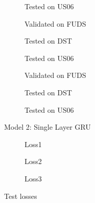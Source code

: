 \begin{figure}[htbp]
\begin{subfigure}[b]{0.33\textwidth}
        \caption{Tested on US06}
    \end{subfigure}
    \begin{subfigure}[b]{0.32\textwidth}
        \centering
        
        \caption{Validated on FUDS}
    \end{subfigure}
    \hfill
    \begin{subfigure}[b]{0.33\textwidth}
        \centering
        
        \caption{Tested on DST}
    \end{subfigure}
    \hfill
    \begin{subfigure}[b]{0.33\textwidth}
        \centering
        
        \caption{Tested on US06}
    \end{subfigure}
        \begin{subfigure}[b]{0.32\textwidth}
        \centering
        
        \caption{Validated on FUDS}
    \end{subfigure}
    \hfill
    \begin{subfigure}[b]{0.33\textwidth}
        \centering
        
        \caption{Tested on DST}
    \end{subfigure}
    \hfill
    \begin{subfigure}[b]{0.33\textwidth}
        \centering
        
        \caption{Tested on US06}
    \end{subfigure}
    
    \caption{Model 2: Single Layer GRU}
    \label{fig:Model-1}
\end{figure}


\begin{figure}[htbp]
    \centering
    \begin{subfigure}[b]{0.5\textwidth}
        \centering
        
        \caption{Loss1}
    \end{subfigure}
    \hfill
    \begin{subfigure}[b]{0.5\textwidth}
        \centering
        
        \caption{Loss2}
    \end{subfigure}
    \hfill
    \begin{subfigure}[b]{0.5\textwidth}
        \centering
        
        \caption{Loss3}
    \end{subfigure}
    
    \caption{Test losses}
    \label{fig:losses}
\end{figure}